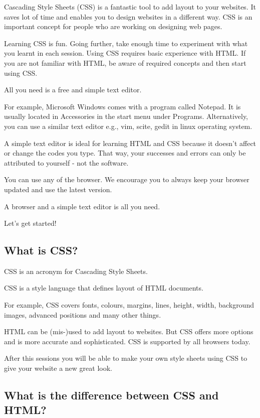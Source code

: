 \documentclass[11pt,a4paper]{article}
\author{TalentSprint}
\date{}
\begin{document}
\hspace{0.1cm} Cascading Style Sheets (CSS) is a fantastic tool to add layout to your websites. It saves lot of time and enables you to design websites in a different way. CSS is an important concept for people who are working on designing web pages.

Learning CSS is fun. Going further, take enough time to experiment with what you learnt in each session.
Using CSS requires basic experience with HTML. If you are not familiar with HTML, be aware of required concepts and then start using CSS.

All you need is a free and simple text editor.

For example, Microsoft Windows comes with a program called Notepad. It is usually located in Accessories in the start menu under Programs. Alternatively, you can use a similar text editor e.g., vim, scite, gedit in linux operating system.

A simple text editor is ideal for learning HTML and CSS because it doesn't affect or change the codes you type. That way, your successes and errors can only be attributed to yourself - not the software.

You can use any of the browser. We encourage you to always keep your browser updated and use the latest version.

A browser and a simple text editor is all you need.

Let's get started!

\subsection*{What is CSS?}
CSS is an acronym for Cascading Style Sheets.

CSS is a style language that defines layout of HTML documents.

For example, CSS covers fonts, colours, margins, lines, height, width, background images, advanced positions and many other things.

HTML can be (mis-)used to add layout to websites. But CSS offers more options and is more accurate and sophisticated. CSS is supported by all browsers today.

After this sessions you will be able to make your own style sheets using CSS to give your website a new great look.

\subsection*{What is the difference between CSS and HTML?}
\end{document}
